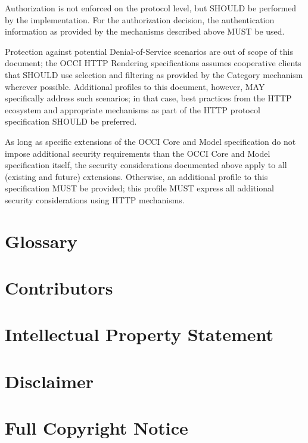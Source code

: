 \documentclass[10pt,a4paper]{article}
\begin{document}
Authorization is not enforced on the protocol level, but SHOULD be
performed by the implementation. For the authorization decision, the
authentication information as provided by the mechanisms described
above MUST be used.

Protection against potential Denial-of-Service scenarios are out of
scope of this document; the OCCI HTTP Rendering specifications assumes
cooperative clients that SHOULD use selection and filtering as
provided by the Category mechanism wherever possible. Additional
profiles to this document, however, MAY specifically address such
scenarios; in that case, best practices from the HTTP ecosystem and
appropriate mechanisms as part of the HTTP protocol specification
SHOULD be preferred.

As long as specific extensions of the OCCI Core and Model
specification do not impose additional security requirements than the
OCCI Core and Model specification itself, the security considerations
documented above apply to all (existing and future)
extensions. Otherwise, an additional profile to this specification
MUST be provided; this profile MUST express all additional security
considerations using HTTP mechanisms.

\section{Glossary}
\label{sec:glossary}


\section{Contributors}


\section{Intellectual Property Statement}


\section{Disclaimer}


\section{Full Copyright Notice}




\end{document}
